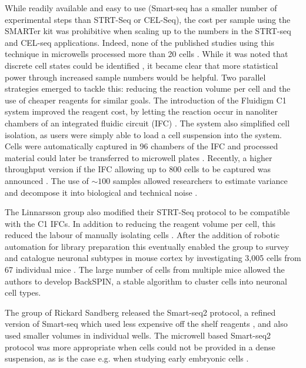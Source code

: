 While readily available and easy to use (Smart-seq has a smaller number of experimental steps than STRT-Seq or CEL-Seq), the cost per sample using the SMARTer kit was prohibitive when scaling up to the numbers in the STRT-seq and CEL-seq applications. Indeed, none of the published studies using this technique in microwells processed more than 20 cells \cite{Ramskold2012-zc, Marinov2014-bf, Shalek2013-lw}. While it was noted that discrete cell states could be identified \cite{Shalek2013-lw}, it became clear that more statistical power through increased sample numbers would be helpful. Two parallel strategies emerged to tackle this: reducing the reaction volume per cell and the use of cheaper reagents for similar goals. The introduction of the Fluidigm C1 system improved the reagent cost, by letting the reaction occur in nanoliter chambers of an integrated fluidic circuit (IFC) \cite{Fluidigm_Corporation2013-vw}. The system also simplified cell isolation, as users were simply able to load a cell suspension into the system. Cells were automatically captured in 96 chambers of the IFC and processed material could later be transferred to microwell plates \cite{Wu2014-ot, Brennecke2013-vv}. Recently, a higher throughput version if the IFC allowing up to 800 cells to be captured was announced \cite{Fluidigm_Corporation2016-jl}. The use of \(\sim 100 \) samples allowed researchers to estimate variance and decompose it into biological and technical noise \cite{Brennecke2013-vv, Kim2015-mh}.

The Linnarsson group also modified their STRT-Seq protocol to be compatible with the C1 IFCs. In addition to reducing the reagent volume per cell, this reduced the labour of manually isolating cells \cite{Islam2014-dx}. After the addition of robotic automation for library preparation this eventually enabled the group to survey and catalogue neuronal subtypes in mouse cortex by investigating 3,005 cells from 67 individual mice \cite{Zeisel2015-mk}. The large number of cells from multiple mice allowed the authors to develop BackSPIN, a stable algorithm to cluster cells into neuronal cell types.

The group of Rickard Sandberg released the Smart-seq2 protocol, a refined version of Smart-seq which used less expensive off the shelf reagents \cite{Picelli2013-px, Picelli2014-hr}, and also used smaller volumes in individual wells. The microwell based Smart-seq2 protocol was more appropriate when cells could not be provided in a dense suspension, as is the case e.g. when studying early embryonic cells \cite{Deng2014-ud}.

